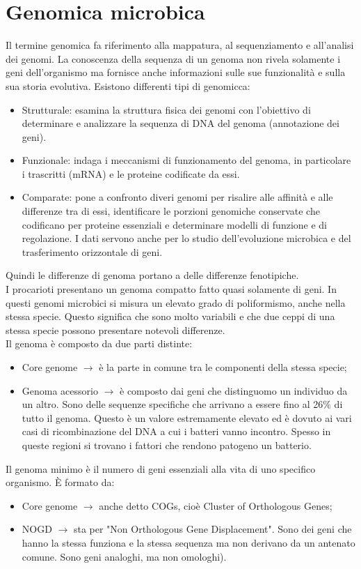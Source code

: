 \chapter{Genomica microbica}
Il termine genomica fa riferimento alla mappatura, al sequenziamento e all'analisi dei genomi. La conoscenza della sequenza di un genoma non rivela solamente i geni dell'organismo ma fornisce anche informazioni sulle sue funzionalit\`a e sulla sua storia evolutiva. Esistono differenti tipi di genomicca:
\begin{itemize}
    \item Strutturale: esamina la struttura fisica dei genomi con l'obiettivo di determinare e analizzare la sequenza di DNA del genoma (annotazione dei geni).
    \item Funzionale: indaga i meccanismi di funzionamento del genoma, in particolare i trascritti (mRNA) e le proteine codificate da essi.
    \item Comparate: pone a confronto diveri genomi per risalire alle affinit\`a e alle differenze tra di essi, identificare le porzioni genomiche conservate che codificano per proteine essenziali e determinare modelli di funzione e di regolazione. I dati servono anche per lo studio dell'evoluzione microbica e del trasferimento orizzontale di geni.
\end{itemize}
Quindi le differenze di genoma portano a delle differenze fenotipiche. 
\\I procarioti presentano un genoma compatto fatto quasi solamente di geni. In questi genomi microbici si misura un elevato grado di poliformismo, anche nella stessa specie. Questo significa che sono molto variabili e che due ceppi di una stessa specie possono presentare notevoli differenze.
\\Il genoma \`e composto da due parti distinte:
\begin{itemize}
    \item Core genome $\xrightarrow{}$ \`e la parte in comune tra le componenti della stessa specie;
    \item Genoma acessorio $\xrightarrow{}$ \`e composto dai geni che distinguomo un individuo da un altro. Sono delle sequenze specifiche che arrivano a essere fino al 26$\%$ di tutto il genoma. Questo \`e un valore estremamente elevato ed \`e dovuto ai vari casi di ricombinazione del DNA a cui i batteri vanno incontro. Spesso in queste regioni si trovano i fattori che rendono patogeno un batterio.
\end{itemize}
Il genoma minimo \`e il numero di geni essenziali alla vita di uno specifico organismo. \`E formato da:
\begin{itemize}
    \item Core genome $\xrightarrow{}$ anche detto COGs, cio\`e Cluster of Orthologous Genes;
    \item NOGD $\xrightarrow{}$ sta per "Non Orthologous Gene Displacement". Sono dei geni che hanno la stessa funziona e la stessa sequenza ma non derivano da un antenato comune. Sono geni analoghi, ma non omologhi).
\end{itemize}
